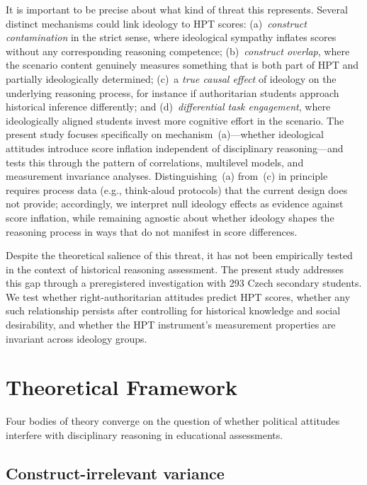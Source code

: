 \documentclass[pdflatex,sn-apa]{sn-jnl}%
\begin{document}
It is important to be precise about what kind of threat this represents. Several distinct mechanisms could link ideology to HPT scores: (a)~\emph{construct contamination} in the strict sense, where ideological sympathy inflates scores without any corresponding reasoning competence; (b)~\emph{construct overlap}, where the scenario content genuinely measures something that is both part of HPT and partially ideologically determined; (c)~a \emph{true causal effect} of ideology on the underlying reasoning process, for instance if authoritarian students approach historical inference differently; and (d)~\emph{differential task engagement}, where ideologically aligned students invest more cognitive effort in the scenario. The present study focuses specifically on mechanism~(a)---whether ideological attitudes introduce score inflation independent of disciplinary reasoning---and tests this through the pattern of correlations, multilevel models, and measurement invariance analyses. Distinguishing~(a) from~(c) in principle requires process data (e.g., think-aloud protocols) that the current design does not provide; accordingly, we interpret null ideology effects as evidence against score inflation, while remaining agnostic about whether ideology shapes the reasoning process in ways that do not manifest in score differences.

Despite the theoretical salience of this threat, it has not been empirically tested in the context of historical reasoning assessment. The present study addresses this gap through a preregistered investigation with 293 Czech secondary students. We test whether right-authoritarian attitudes predict HPT scores, whether any such relationship persists after controlling for historical knowledge and social desirability, and whether the HPT instrument's measurement properties are invariant across ideology groups.


\section{Theoretical Framework}\label{sec:theory}

Four bodies of theory converge on the question of whether political attitudes interfere with disciplinary reasoning in educational assessments.

\subsection{Construct-irrelevant variance}\label{subsec:civ}
\end{document}
